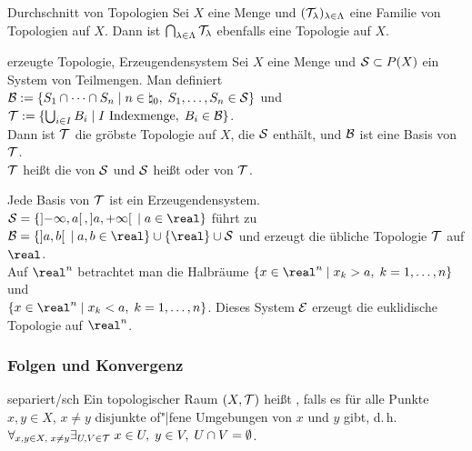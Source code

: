\linie

\begin{Lemma}{Durchschnitt von Topologien}
    Sei $X$ eine Menge und $(\T_\lambda)_{\lambda \in \Lambda}$ eine Familie
    von Topologien auf $X$.
    Dann ist $\bigcap_{\lambda \in \Lambda} \T_\lambda$ ebenfalls eine
    Topologie auf $X$.
\end{Lemma}

\begin{Def}{erzeugte Topologie, Erzeugendensystem}
    Sei $X$ eine Menge und $\S \subset P(X)$ ein System von Teilmengen.
    Man definiert
    $\B := \{S_1 \cap \dotsb \cap S_n \;|\;
    n \in \natural_0,\; S_1, \dotsc, S_n \in \mathcal{S}\}$ und \\
    $\mathcal{T} := \{\bigcup_{i \in I} B_i \;|\; I \text{ Indexmenge},\;
    B_i \in \B\}$. \\
    Dann ist $\T$ die gröbste Topologie auf $X$, die $\S$ enthält,
    und $\B$ ist eine Basis von $\T$. \\
    $\T$ heißt die von $\S$  und
    $\S$ heißt  oder  von $\T$.
\end{Def}

\begin{Bsp}
    Jede Basis von $\T$ ist ein Erzeugendensystem. \\
    $\mathcal{S} =
    \{\left]-\infty, a\right[, \left]a, +\infty\right[ \;|\; a \in \real\}$
    führt zu $\B = \{\left]a, b\right[ \;|\; a, b \in \real\}
    \cup \{\real\} \cup \mathcal{S}$
    und erzeugt die übliche Topologie $\T$ auf $\real$. \\
    Auf $\real^n$ betrachtet man die Halbräume
    $\{x \in \real^n \;|\; x_k > a,\; k = 1, \dotsc, n\}$ und \\
    $\{x \in \real^n \;|\; x_k < a,\; k = 1, \dotsc, n\}$.
    Dieses System $\E$ erzeugt die euklidische Topologie auf $\real^n$.
\end{Bsp}

\subsubsection{%
    Folgen und Konvergenz%
}

\begin{Def}{separiert/sch}
    Ein topologischer Raum $(X, \T)$ heißt
    ,
    falls es für alle Punkte $x, y \in X$, $x \not= y$
    disjunkte of"|fene Umgebungen von $x$ und $y$ gibt, d.\,h.
    $\forall_{x, y \in X,\; x \not= y} \exists_{U, V \in \T}\;
    x \in U,\; y \in V,\; U \cap V = \emptyset$.
\end{Def}

